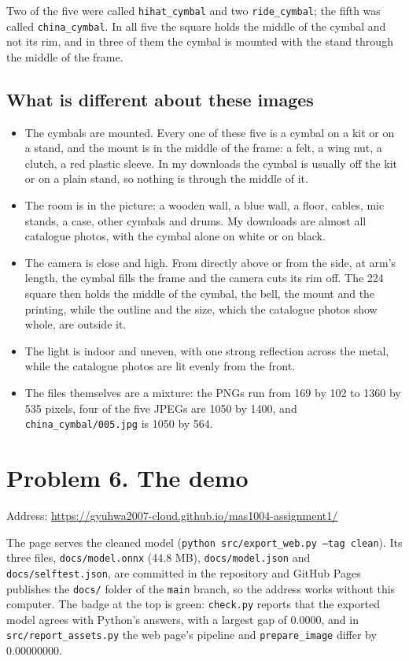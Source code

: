 \documentclass[11pt]{article}
\begin{document}
Two of the five were called \texttt{hihat\_cymbal} and two \texttt{ride\_cymbal};
the fifth was called \texttt{china\_cymbal}. In all five the square holds the
middle of the cymbal and not its rim, and in three of them the cymbal is
mounted with the stand through the middle of the frame.

\subsection*{What is different about these images}

\begin{itemize}
\item The cymbals are mounted. Every one of these five is a cymbal on a kit or
on a stand, and the mount is in the middle of the frame: a felt, a wing nut, a
clutch, a red plastic sleeve. In my downloads the cymbal is usually off the
kit or on a plain stand, so nothing is through the middle of it.
\item The room is in the picture: a wooden wall, a blue wall, a floor, cables,
mic stands, a case, other cymbals and drums. My downloads are almost all
catalogue photos, with the cymbal alone on white or on black.
\item The camera is close and high. From directly above or from the side, at
arm's length, the cymbal fills the frame and the camera cuts its rim off. The
224 square then holds the middle of the cymbal, the bell, the mount and the
printing, while the outline and the size, which the catalogue photos show
whole, are outside it.
\item The light is indoor and uneven, with one strong reflection across the
metal, while the catalogue photos are lit evenly from the front.
\item The files themselves are a mixture: the PNGs run from 169 by 102 to 1360
by 535 pixels, four of the five JPEGs are 1050 by 1400, and
\texttt{china\_cymbal/005.jpg} is 1050 by 564.
\end{itemize}

\section*{Problem 6. The demo}

Address: \url{https://gyuhwa2007-cloud.github.io/mas1004-assignment1/}

The page serves the cleaned model (\texttt{python src/export\_web.py --tag
clean}). Its three files, \texttt{docs/model.onnx} (44.8 MB),
\texttt{docs/model.json} and \texttt{docs/selftest.json}, are committed in the
repository and GitHub Pages publishes the \texttt{docs/} folder of the
\texttt{main} branch, so the address works without this computer. The badge at
the top is green: \texttt{check.py} reports that the exported model agrees with
Python's answers, with a largest gap of 0.0000, and in
\texttt{src/report\_assets.py} the web page's pipeline and
\texttt{prepare\_image} differ by 0.00000000.
\end{document}
